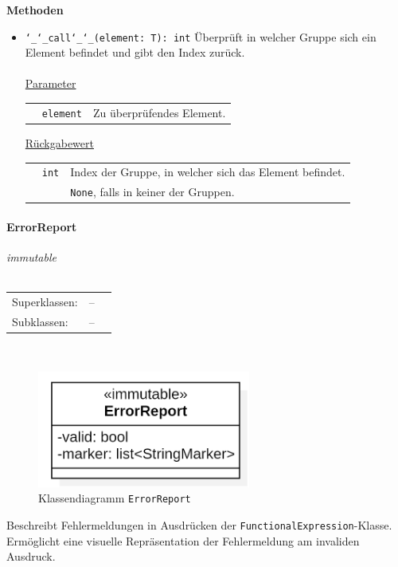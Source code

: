 \documentclass{article}
\newcommand{\classheader}[2][]{\paragraph{#2}
\mbox{}\textit{#1}\\\\}
\begin{document}
\textbf{Methoden}
\begin{itemize}
\item \texttt{\char`_\char`_call\char`_\char`_(element: T): int} \newline Überprüft in welcher Gruppe sich ein Element befindet und gibt den Index zurück.
\\\\
\underline{{Parameter}}

\begin{tabular}{lll}
 & \texttt{element} & Zu überprüfendes Element. \\
\end{tabular}

\underline{Rückgabewert}

\begin{tabular}{lll}
 & \texttt{int} & Index der Gruppe, in welcher sich das Element befindet. \\
 && \texttt{None}, falls in keiner der Gruppen.\\
\end{tabular}
\end{itemize}


\newpage
\classheader[\flqq{}immutable\frqq]{ErrorReport}\label{cls:ErrorReport}
\begin{tabular}{lll}
 Superklassen: & --\\
 Subklassen: & --\\
\end{tabular}\\
\begin{figure}[H]%
    \centering
    \includegraphics[width=7cm]{entwurf/Entwurf_dokument/img/cls/model/ErrorReport.png}
    \caption{Klassendiagramm \texttt{ErrorReport}}
\end{figure}

Beschreibt Fehlermeldungen in Ausdrücken der \texttt{FunctionalExpression}-Klasse. \\ Ermöglicht eine visuelle Repräsentation der Fehlermeldung am invaliden Ausdruck.
\newline \newline
\end{document}
